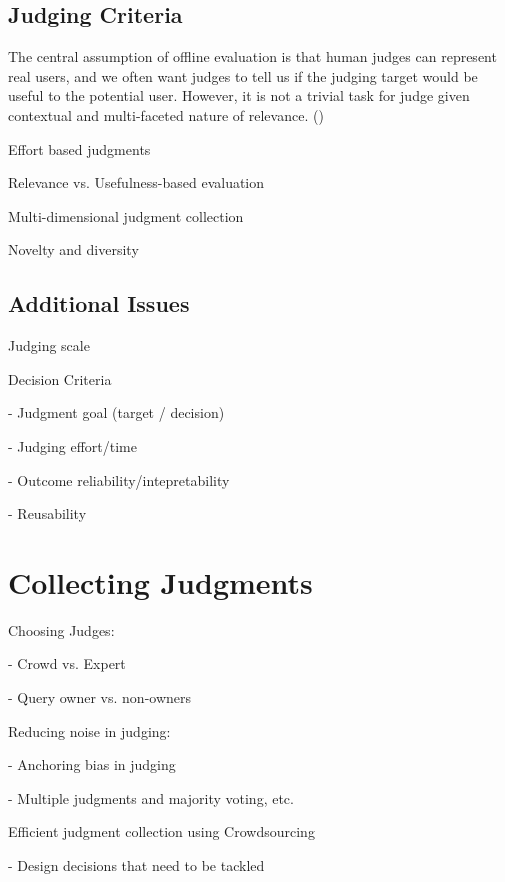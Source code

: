 \documentclass[openany]{now} %
\newcommand{\newpar}{\bigskip\noindent}
\begin{document}
\subsection{Judging Criteria}
The central assumption of offline evaluation is that human judges can represent real users, and we often want judges to tell us if the judging target would be useful to the potential user. However, it is not a trivial task for judge given contextual and multi-faceted nature of relevance. (\cite{Borlund:2003})

\newpar
Effort based judgments \cite{Yilmaz:2014} \cite{VermaYC16}

\newpar
Relevance vs. Usefulness-based evaluation \cite{Zhou:2012} \cite{Kim2016}

\newpar
Multi-dimensional judgment collection \cite{Golbus:2014:CDR} \cite{Kim:2013}

\newpar
Novelty and diversity \cite{Chandar2013}


\subsection{Additional Issues}

\newpar
Judging scale \cite{Turpin2015} \cite{Jarvelin:2002}

\newpar
Decision Criteria

- Judgment goal (target / decision)

- Judging effort/time

- Outcome reliability/intepretability

- Reusability

\section{Collecting Judgments}
\label{s-collect-jgmts}
Choosing Judges: 

- Crowd vs. Expert \cite{Kazai:2013} \cite{Alonso20121053}

- Query owner vs. non-owners \cite{Chouldechova:2013}

\newpar
Reducing noise in judging: 

- Anchoring bias in judging \cite{Shokouhi:2015}

- Multiple judgments and majority voting, etc. \cite{Venanzi:2014}

\cite{aroyo2013measuring} \cite{aroyo2013crowd}

\newpar
Efficient judgment collection using Crowdsourcing

- Design decisions that need to be tackled  \cite{Blanco:2011} \cite{Kazai2012} \cite{Alonso2012} \cite{Alonso:2015} \cite{Scholer:2013} 
\end{document}
